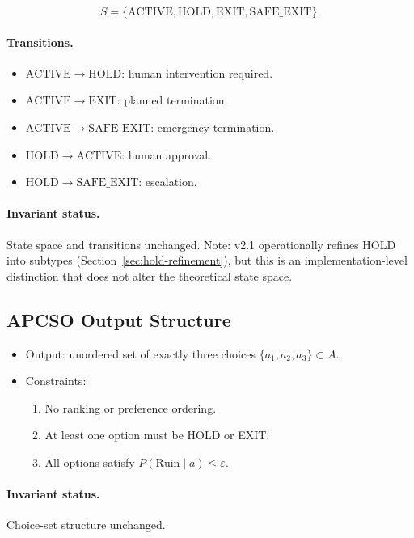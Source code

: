 \begin{equation}
S = \{\mathrm{ACTIVE}, \mathrm{HOLD}, \mathrm{EXIT}, \mathrm{SAFE\_EXIT}\}.
\end{equation}

\paragraph{Transitions.}
\begin{itemize}
\item $\mathrm{ACTIVE} \to \mathrm{HOLD}$: human intervention required.
\item $\mathrm{ACTIVE} \to \mathrm{EXIT}$: planned termination.
\item $\mathrm{ACTIVE} \to \mathrm{SAFE\_EXIT}$: emergency
termination.
\item $\mathrm{HOLD} \to \mathrm{ACTIVE}$: human approval.
\item $\mathrm{HOLD} \to \mathrm{SAFE\_EXIT}$: escalation.
\end{itemize}

\paragraph{Invariant status.}
State space and transitions unchanged. Note: v2.1 operationally
refines HOLD into subtypes
(Section~\ref{sec:hold-refinement}), but this is an
implementation-level distinction that does not alter the theoretical
state space.

\subsection{APCSO Output Structure}
\label{sec:inv-apcso}

\begin{itemize}
\item Output: unordered set of exactly three choices
$\{a_1, a_2, a_3\} \subset A$.
\item Constraints:
\begin{enumerate}
\item No ranking or preference ordering.
\item At least one option must be HOLD or EXIT.
\item All options satisfy
$P(\mathrm{Ruin} \mid a) \le \varepsilon$.
\end{enumerate}
\end{itemize}

\paragraph{Invariant status.}
Choice-set structure unchanged.


